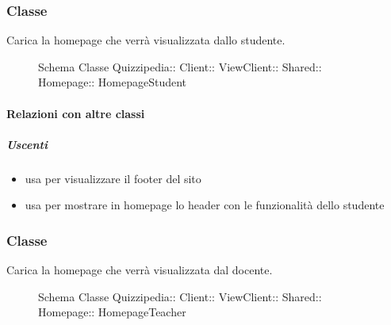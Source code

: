 \subsubsection{Classe }
Carica la homepage che verrà visualizzata dallo studente.
\begin{figure}[H]
\centering
\noindent{}
\caption[Schema Classe HomepageStudent]{Schema Classe Quizzipedia:: Client:: ViewClient:: Shared:: Homepage:: HomepageStudent}
\end{figure}
\paragraph{Relazioni con altre classi}
\subparagraph{Uscenti}
\begin{itemize}
\item usa  per visualizzare il footer del sito
\item usa  per mostrare in homepage lo header con le funzionalità dello studente
\end{itemize}
\subsubsection{Classe }
Carica la homepage che verrà visualizzata dal docente.
\begin{figure}[H]
\centering
\noindent{}
\caption[Schema Classe HomepageTeacher]{Schema Classe Quizzipedia:: Client:: ViewClient:: Shared:: Homepage:: HomepageTeacher}
\end{figure}

